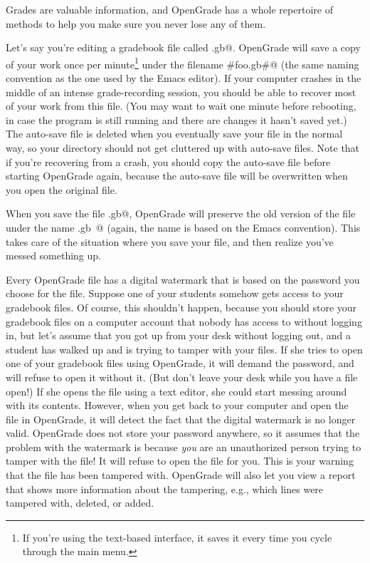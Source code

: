 \documentclass{opengrade_doc}
\begin{document}
\label{safety}
Grades are valuable information, and OpenGrade has a whole
repertoire of methods to help you make sure you never lose any
of them. 

Let's say you're editing a gradebook file called \verb@foo.gb@. 
OpenGrade will
save a copy of your work once per minute\footnote{If you're using the text-based
interface, it saves it every time you cycle through the main menu.}
under the
filename \verb@#foo.gb#@ (the same naming convention as the one
used by the Emacs editor). If your computer crashes in the middle
of an intense grade-recording session, you should be able to
recover most of your work from this file. (You may want to wait
one minute before rebooting, in case the program is still running and
there are changes it hasn't saved yet.)
The auto-save file is
deleted when you eventually save your file in the normal way,
so your directory should not get cluttered up with auto-save files.
Note that if you're recovering from a crash, you should
copy the auto-save file before starting OpenGrade again,
because the auto-save file will be overwritten when you open the
original file.

When you save the file \verb@foo.gb@, OpenGrade will
preserve the old version of the file under the name
\verb@foo.gb~@ (again, the name is based on the Emacs convention).
This takes care of the situation where you
save your file, and then realize you've messed something up.

\label{authentication}
Every OpenGrade file has a digital watermark that is based on
the password you choose for the file. 
Suppose one of your students somehow gets access to your gradebook
files. Of course, this shouldn't happen, because you should store
your gradebook files on a computer account that nobody has access
to without logging in, but let's assume that you got up from your
desk without logging out, and a student has walked up and is trying
to tamper with your files.
If she tries to open one of your gradebook files using OpenGrade, it
will demand the password, and will refuse to open it without it.
(But don't leave your desk while you have a file open!)
If she opens the file using a text editor, she could start messing
around with its contents. However, when you get back to your computer
and open the file in OpenGrade, it will detect the fact that the
digital watermark is no longer valid. OpenGrade does not store your
password anywhere, so it assumes that the problem with the watermark
is because \emph{you} are an unauthorized person trying to tamper
with the file! It will refuse to open the file for you. This is
your warning that the file has been tampered with. OpenGrade will also
let you view a report that shows more information about the tampering,
e.g., which lines were tampered with, deleted, or added.
\end{document}
